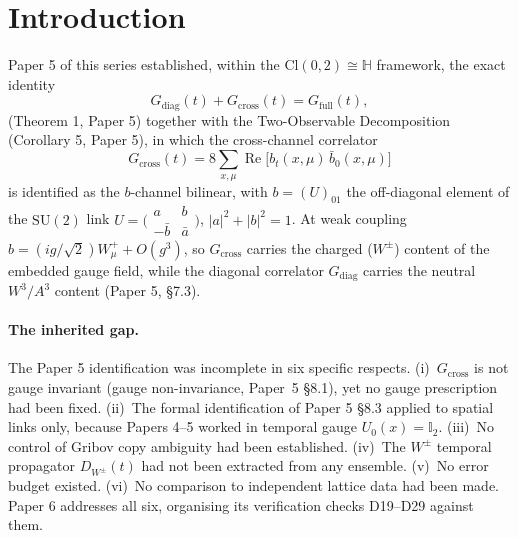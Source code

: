 \documentclass[11pt,a4paper]{article}
\theoremstyle{plain}
\theoremstyle{definition}
\theoremstyle{remark}
\newcommand{\Cl}{\mathrm{Cl}}
\newcommand{\SU}{\mathrm{SU}}
\renewcommand{\Re}{\operatorname{Re}}
\newcommand{\Gcross}{G_{\mathrm{cross}}}
\newcommand{\Gdiag}{G_{\mathrm{diag}}}
\newcommand{\Gfull}{G_{\mathrm{full}}}
\newcommand{\DW}{D_{W^{\pm}}}
\newcommand{\Id}{\mathbb{I}}
\begin{document}
\section{Introduction}
\label{sec:intro}

Paper 5 of this series established, within the
$\Cl(0,2)\cong\mathbb{H}$ framework, the exact identity
\begin{equation}
  \Gdiag(t)+\Gcross(t)=\Gfull(t),
  \label{eq:thm1}
\end{equation}
(Theorem 1, Paper 5) together with the Two-Observable Decomposition
(Corollary 5, Paper 5), in which the cross-channel correlator
\begin{equation}
  \Gcross(t)=8\sum_{x,\mu}\Re\!\bigl[b_t(x,\mu)\,\bar b_0(x,\mu)\bigr]
  \label{eq:gcrossdef}
\end{equation}
is identified as the $b$-channel bilinear, with $b=(U)_{01}$ the
off-diagonal element of the $\SU(2)$ link
$U=\bigl(\begin{smallmatrix} a & b\\ -\bar b & \bar a
\end{smallmatrix}\bigr)$, $|a|^2+|b|^2=1$. At weak coupling
$b=(ig/\sqrt2)W^{+}_{\mu}+O(g^{3})$, so $\Gcross$ carries the charged
($W^{\pm}$) content of the embedded gauge field, while the diagonal
correlator $\Gdiag$ carries the neutral $W^{3}/A^{3}$ content
(Paper 5, \S7.3).

\paragraph{The inherited gap.}
The Paper 5 identification was incomplete in six specific respects.
(i)~$\Gcross$ is not gauge invariant (gauge non-invariance, Paper~5 \S8.1), yet no
gauge prescription had been fixed. (ii)~The formal identification of
Paper 5 \S8.3 applied to spatial links only, because Papers 4--5 worked
in temporal gauge $U_0(x)=\Id_2$. (iii)~No control of Gribov copy
ambiguity had been established. (iv)~The $W^{\pm}$ temporal propagator
$\DW(t)$ had not been extracted from any ensemble. (v)~No error budget
existed. (vi)~No comparison to independent lattice data had been made.
Paper 6 addresses all six, organising its verification checks D19--D29
against them.
\end{document}
